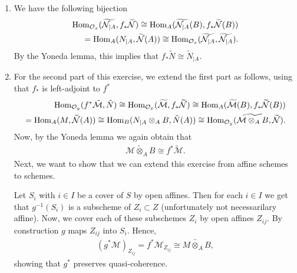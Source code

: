 \newcommand{\sheet}{7}




\maketitle{}

\begin{exercise}{1}
    \begin{enumerate}
        \item We have the following bijection
        \begin{align*}
            \operatorname{Hom}_{\mathcal{O}_x}(\widetilde{\mathcal{N}_{|A}},f_*\widetilde{\mathcal{N}})\cong \operatorname{Hom}_A (\widetilde{\mathcal{N}_{|A}}(B),f_*\widetilde{\mathcal{N}}(B))\\
            =\operatorname{Hom}_A(N_{|A},\widetilde{\mathcal{N}}(A))\cong \operatorname{Hom}_{\mathcal{O}_x}(\widetilde{\mathcal{N}_{|A}},\widetilde{\mathcal{N}_{|A}}).
        \end{align*}
        By the Yoneda lemma, this implies that $f_*\widetilde{N}\cong \tilde{N}_{|A}$.
        \item For the second part of this exercise, we extend the first part as follows, using that $f_*$ is left-adjoint to $f^*$
        \begin{align*}
            \operatorname{Hom}_{\mathcal{O}_y}(f^*\tilde{\mathcal{M}},\tilde{N})
            \cong \operatorname{Hom}_{\mathcal{O}_x}(\widetilde{\mathcal{M}},f_*\widetilde{\mathcal{N}})
            \cong \operatorname{Hom}_A (\widetilde{\mathcal{M}}(B),f_*\widetilde{\mathcal{N}}(B))\\
            = \operatorname{Hom}_A(M,\widetilde{\mathcal{N}}(A))
            \cong \operatorname{Hom}_B(N_{|A}\otimes_A B, \tilde{N}(A))
            \cong \operatorname{Hom}_{\mathcal{O}_y}(\widetilde{\mathcal{M}\otimes_A B}, \widetilde{\mathcal{N}}).
        \end{align*} 
        Now, by the Yoneda lemma we again obtain that 
        \begin{align*}
            \widetilde{\mathcal{M}\otimes_A B} 
            \cong f^*\tilde{\mathcal{M}}.
        \end{align*}
        Next, we want to show that we can extend this exercise from affine schemes to schemes.
        
        Let $S_i$ with $i\in I$ be a cover of $S$ by open affines. Then for each $i\in I$ we get that
        $g^{-1}(S_i)$ is a subscheme of $Z_i\subset Z$ (unfortunately not necessarilary affine). Now, we cover
        each of these subschemes $Z_i$ by open affines $Z_{ij}$. By construction $g$ maps $Z_{ij}$ into $S_i$.
        Hence, 
        \begin{align*}
            (g^*\mathcal{M})_{Z_{ij}}=f^*\mathcal{M}_{Z_{ij}}\cong \widetilde{M\otimes_A B},
        \end{align*}
        showing that $g^*$ preserves quasi-coherence.
    \end{enumerate}
\end{exercise}

